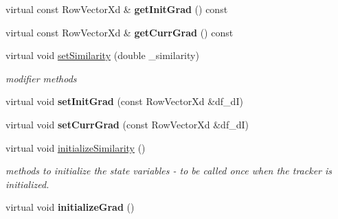 \begin{DoxyCompactItemize}
\item 
\hypertarget{classAppearanceModel_afed0a650b7c50607781aab7a1efad295}{virtual const Row\-Vector\-Xd \& {\bfseries get\-Init\-Grad} () const }\label{classAppearanceModel_afed0a650b7c50607781aab7a1efad295}

\item 
\hypertarget{classAppearanceModel_a3a368798dc03a8ad0ebd4beaa0679776}{virtual const Row\-Vector\-Xd \& {\bfseries get\-Curr\-Grad} () const }\label{classAppearanceModel_a3a368798dc03a8ad0ebd4beaa0679776}

\item 
\hypertarget{classAppearanceModel_a615e1e41bfe54f3c36d9ea88d2a3da57}{virtual void \hyperlink{classAppearanceModel_a615e1e41bfe54f3c36d9ea88d2a3da57}{set\-Similarity} (double \-\_\-similarity)}\label{classAppearanceModel_a615e1e41bfe54f3c36d9ea88d2a3da57}

\begin{DoxyCompactList}\small\item\em modifier methods \end{DoxyCompactList}\item 
\hypertarget{classAppearanceModel_aff31a111da5b55e52012c0d23360e7c3}{virtual void {\bfseries set\-Init\-Grad} (const Row\-Vector\-Xd \&df\-\_\-d\-I)}\label{classAppearanceModel_aff31a111da5b55e52012c0d23360e7c3}

\item 
\hypertarget{classAppearanceModel_aa908daa1a4fc6e6a2300d472f27fa256}{virtual void {\bfseries set\-Curr\-Grad} (const Row\-Vector\-Xd \&df\-\_\-d\-I)}\label{classAppearanceModel_aa908daa1a4fc6e6a2300d472f27fa256}

\item 
virtual void \hyperlink{classAppearanceModel_abcd79170a5fccc0e9aa10675404ad655}{initialize\-Similarity} ()
\begin{DoxyCompactList}\small\item\em methods to initialize the state variables -\/ to be called once when the tracker is initialized. \end{DoxyCompactList}\item 
\hypertarget{classAppearanceModel_a553b254253ba3c10672b401ff2dbb403}{virtual void {\bfseries initialize\-Grad} ()}\label{classAppearanceModel_a553b254253ba3c10672b401ff2dbb403}


\end{DoxyCompactItemize}
